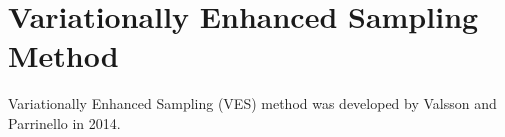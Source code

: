 \section{Variationally Enhanced Sampling Method\label{Sec:ES:VES}}
Variationally Enhanced Sampling (VES) method was developed by Valsson and Parrinello in 2014.\cite{ValssonPRL2014} 
